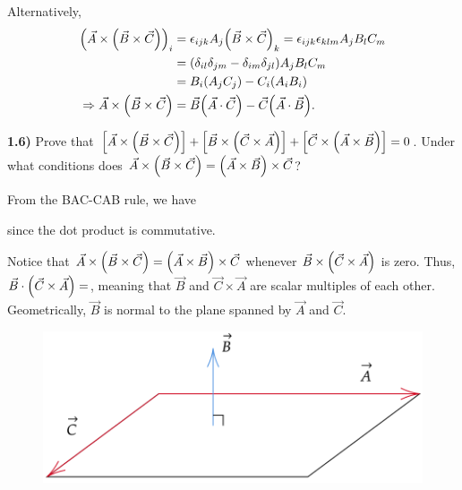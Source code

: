 \documentclass[12pt,a4paper]{article}
\newcommand{\bef}{\begin{figure}[h!]\centering}
\newcommand{\eef}{\end{figure}}
\newcommand{\prob}[2]{\textbf{#1)} #2}
\begin{document}
Alternatively,
\begin{align*}
\qty(\vec{A} \times \qty(\vec{B} \times \vec{C}))_{i} &= \epsilon_{ijk}A_j\qty(\vec{B} \times \vec{C})_{k} = \epsilon_{ijk}\epsilon_{klm}A_jB_lC_m \\
&= \qty(\delta_{il}\delta_{jm} - \delta_{im}\delta_{jl})A_jB_lC_m \\
&= B_i\qty(A_jC_j) - C_i\qty(A_iB_i) \\
\Rightarrow \vec{A} \times \qty(\vec{B} \times \vec{C}) &= \vec{B}\qty(\vec{A} \cdot \vec{C}) - \vec{C}\qty(\vec{A} \cdot \vec{B}).
\end{align*}


\prob{1.6}{Prove that $\qty[\vec{A} \times \qty(\vec{B} \times \vec{C})] + \qty[\vec{B} \times \qty(\vec{C} \times \vec{A})] + \qty[\vec{C} \times \qty(\vec{A} \times \vec{B})] = 0$. Under what conditions does $\vec{A} \times \qty(\vec{B} \times \vec{C}) = \qty(\vec{A} \times \vec{B}) \times \vec{C}$?}

From the BAC-CAB rule, we have
since the dot product is commutative.

Notice that $\vec{A} \times \qty(\vec{B} \times \vec{C}) = \qty(\vec{A} \times \vec{B}) \times \vec{C}$ whenever $\vec{B} \times \qty(\vec{C} \times \vec{A})$ is zero.
Thus, $\vec{B} \cdot \qty(\vec{C} \times \vec{A}) = $, meaning that $\vec{B}$ and $\vec{C} \times \vec{A}$ are scalar multiples of each other.
Geometrically, $\vec{B}$ is normal to the plane spanned by $\vec{A}$ and $\vec{C}$.

\bef
\includegraphics[scale=0.3]{./fig1.png}
\eef
\end{document}
